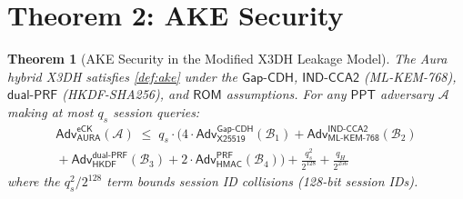 \documentclass[11pt,a4paper]{article}
\newtheorem{theorem}{Theorem}[section]
\theoremstyle{definition}
\theoremstyle{remark}
\newcommand{\ppt}{\mathsf{PPT}}
\newcommand{\adv}{\mathsf{Adv}}
\newcommand{\advA}{\mathcal{A}}
\newcommand{\advB}{\mathcal{B}}
\newcommand{\HKDF}{\mathsf{HKDF}}
\newcommand{\HMAC}{\mathsf{HMAC}}
\renewcommand{\DH}{\mathsf{X25519}}
\newcommand{\KEM}{\mathsf{ML\text{-}KEM\text{-}768}}
\newcommand{\GapCDH}{\mathsf{Gap\text{-}CDH}}
\newcommand{\INDCCA}{\mathsf{IND\text{-}CCA2}}
\newcommand{\PRF}{\mathsf{PRF}}
\newcommand{\dualPRF}{\mathsf{dual\text{-}PRF}}
\newcommand{\ROM}{\mathsf{ROM}}
\newcommand{\eCK}{\mathsf{eCK}}
\begin{document}
\section{Theorem 2: AKE Security}
\label{sec:thm2}

\begin{theorem}[AKE Security in the Modified X3DH Leakage Model]
\label{thm:ake}
The Aura hybrid X3DH satisfies \cref{def:ake}
under the $\GapCDH$, $\INDCCA$ (ML-KEM-768), $\dualPRF$ (HKDF-SHA256), and
$\ROM$ assumptions.  For any $\ppt$ adversary $\advA$ making at most $q_s$
session queries:
\begin{multline*}
  \adv^{\eCK}_{\mathsf{AURA}}(\advA) \;\leq\;
  q_s \cdot \bigl(
    4 \cdot \adv^{\GapCDH}_{\DH}(\advB_1) +
    \adv^{\INDCCA}_{\KEM}(\advB_2) \\
    {} + \adv^{\dualPRF}_{\HKDF}(\advB_3) +
    2 \cdot \adv^{\PRF}_{\HMAC}(\advB_4)
  \bigr) + \frac{q_s^2}{2^{128}} + \frac{q_H}{2^{256}}
\end{multline*}
where the $q_s^2 / 2^{128}$ term bounds session ID collisions (128-bit session IDs).
\end{theorem}
\end{document}

